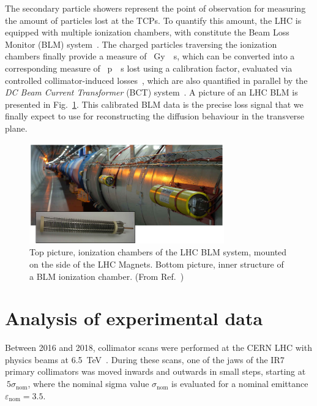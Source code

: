 The secondary particle showers represent the point of observation for measuring the amount of particles lost at the TCPs. To quantify this amount, the LHC is equipped with multiple ionization chambers, with constitute the Beam Loss Monitor (BLM) system~\cite{blmSystem1, blmSystem2}. The charged particles traversing the ionization chambers finally provide a measure of \SI{}{Gy \per s}, which can be converted into a corresponding measure of \SI{}{p \per s} lost using a calibration factor, evaluated via controlled collimator-induced losses~\cite{arek}, which are also quantified in parallel by the \textit{DC Beam Current Transformer} (BCT) system~\cite{Denard:1213275}. A picture of an LHC BLM is presented in Fig.~\ref{fig:blm}. This calibrated BLM data is the precise loss signal that we finally expect to use for reconstructing the diffusion behaviour in the transverse plane.

\begin{figure}[htp]
    \centering
    \includegraphics[width=0.75\textwidth]{5_Diffusion_measurement_LHC/figs/blm.png}
    \caption{Top picture, ionization chambers of the LHC BLM system, mounted on the side of the LHC Magnets. Bottom picture, inner structure of a BLM ionization chamber. (From Ref.~\cite{blmonline})}
    \label{fig:blm}
\end{figure}


%
\section{Analysis of experimental data}
%

Between 2016 and 2018, collimator scans were performed at the CERN LHC with physics beams at \SI{6.5}{TeV}~\cite{PhysRevAccelBeams.23.044802}. During these scans, one of the jaws of the IR7 primary collimators was moved inwards and outwards in small steps, starting at $~5\sigma_\text{nom}$, where the nominal sigma value $\sigma_\text{nom}$ is evaluated for a nominal emittance $\varepsilon_\text{nom} = 3.5$.

